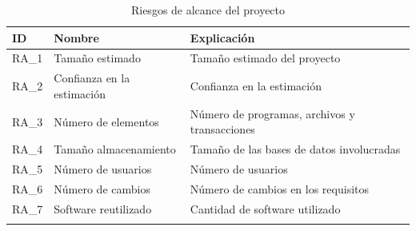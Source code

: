\begin{enumerate}
\begin{itemize}
\begin{longtable}{l p{5cm} p{9cm}}
\hline
\textbf{ID} & \textbf{Nombre} & \textbf{Explicación} \\
\hline
\endhead
\endfoot
RA\_1 & 
Tamaño estimado &
Tamaño estimado del proyecto
 \\
RA\_2 & 
Confianza en la estimación &
Confianza en la estimación
 \\
RA\_3 & 
Número de elementos &
Número de programas, archivos y transacciones
 \\
RA\_4 & 
Tamaño almacenamiento &
Tamaño de las bases de datos involucradas
 \\
RA\_5 & 
Número de usuarios &
Número de usuarios 
 \\
RA\_6 & 
Número de cambios &
Número de cambios en los requisitos
 \\
RA\_7 & 
Software reutilizado &
Cantidad de software utilizado
 \\
\hline
\caption{Riesgos de alcance del proyecto}\label{ries_alcan}\\
\end{longtable}


\end{itemize}
\end{enumerate}
